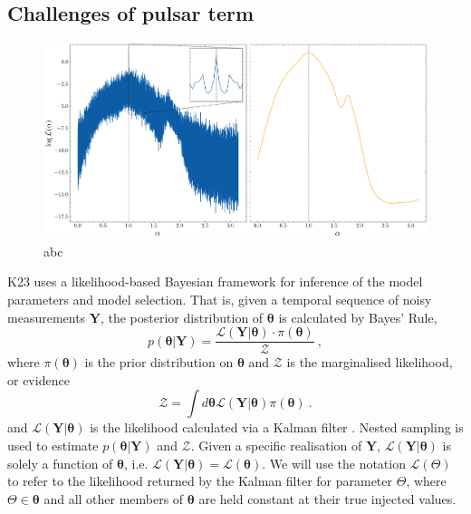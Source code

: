 \documentclass[fleqn,usenatbib,useAMS]{mnras}
\begin{document}
\subsection{Challenges of pulsar term}
\begin{figure}
	\includegraphics[width=\textwidth, height =0.5\textwidth ]{images/Likelihoods_alpha}
	\caption{abc}
	\label{fig:likelihood_comparison}
\end{figure}


K23 uses a likelihood-based Bayesian framework for inference of the model parameters and model selection. That is, given a temporal sequence of noisy measurements $\boldsymbol{Y}$, the posterior distribution of $\boldsymbol{\theta}$ is calculated by 
Bayes' Rule,
\begin{equation}
	p(\boldsymbol{\theta} | \boldsymbol{Y}) = \frac{\mathcal{L}(\boldsymbol{Y} | \boldsymbol{\theta}) \cdot \pi(\boldsymbol{\theta})}{\mathcal{Z}} \ ,
\end{equation}
where $\pi(\boldsymbol{\theta})$ is the prior distribution on $\boldsymbol{\theta}$ and $\mathcal{Z}$ is the marginalised likelihood, or evidence
\begin{equation}
	\mathcal{Z} = \int d \boldsymbol{\theta} \mathcal{L}(\boldsymbol{Y} | \boldsymbol{\theta})  \pi(\boldsymbol{\theta})  \ . \label{eq:model_evidence}
\end{equation}
and $\mathcal{L}(\boldsymbol{Y}| \boldsymbol{\theta})$ is the likelihood calculated via a Kalman filter \citep{Kalman1}. Nested sampling \citep{Skilling} is used to estimate $p(\boldsymbol{\theta} | \boldsymbol{Y})$ and $\mathcal{Z}$. Given a specific realisation of $\boldsymbol{Y}$, $\mathcal{L}(\boldsymbol{Y}| \boldsymbol{\theta})$ is solely a function of $\boldsymbol{\theta}$, i.e. $\mathcal{L}(\boldsymbol{Y}| \boldsymbol{\theta}) = \mathcal{L}(\boldsymbol{\theta})$. We will use the notation $\mathcal{L}(\Theta)$ to refer to the likelihood returned by the Kalman filter for parameter $\Theta$, where $\Theta \in \boldsymbol{\theta}$ and all other members of $\boldsymbol{\theta}$ are held constant at their true injected values. \newline 
\end{document}
